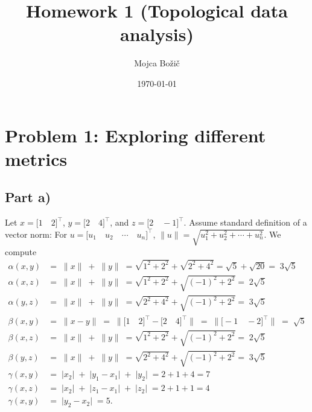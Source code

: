 \documentclass[11pt,a4paper]{article}
\title{Homework 1 (Topological data analysis)}
\author{Mojca Božič}
\date{\today}
\theoremstyle{plain}
\theoremstyle{definition}
\theoremstyle{remark}
\begin{document}
\maketitle

\tableofcontents

\section{Problem 1: Exploring different metrics}

\subsection{Part a)}

Let $x = \big[ 1 \quad 2 \big]^\top$, $y = \big[ 2\quad 4 \big]^\top$, and $z = \big[ 2 \quad -1 \big]^\top$.
Assume standard definition of a vector norm: For $u = \big[ u_1 \quad u_2 \quad \cdots \quad u_n \big]^\top$, 
$\rVert u \lVert = \sqrt{u_1^2 + u_2^2 + \cdots + u_n^2} $. We compute
\begin{equation*}
    \begin{aligned}
        \alpha(x, y) &= \;\rVert x \lVert \;+\; \rVert y \lVert \;= \sqrt{1^2 + 2^2} + \sqrt{2^2 + 4^2} = \sqrt{5} + \sqrt{20} = \; 3\sqrt{5} \\
        \alpha(x, z) &= \;\rVert x \lVert \;+ \;\rVert y \lVert \;= \sqrt{1^2 + 2^2} + \sqrt{(-1)^2 + 2^2} = \; 2\sqrt{5} \\   
        \alpha(y, z) &= \;\rVert x \lVert\; +\; \rVert y \lVert \;= \sqrt{2^2 + 4^2} + \sqrt{(-1)^2 + 2^2} = \; 3\sqrt{5} \\   
        \beta(x, y) &= \;\rVert x - y \lVert \;= \;\rVert \big[ 1 \quad 2 \big]^\top - \big[ 2\quad 4 \big]^\top \lVert \; = \; \rVert \big[ -1 \quad -2 \big]^\top \lVert \; = \; \sqrt{5} \\
        \beta(x, z) &= \;\rVert x \lVert \;+ \;\rVert y \lVert \;= \sqrt{1^2 + 2^2} + \sqrt{(-1)^2 + 2^2} = \; 2\sqrt{5} \\   
        \beta(y, z) &= \;\rVert x \lVert \;+ \;\rVert y \lVert \;= \sqrt{2^2 + 4^2} + \sqrt{(-1)^2 + 2^2} = \; 3\sqrt{5} \\   
        \gamma(x, y) &= \;\rvert x_2 \lvert \; + \; \rvert y_1 - x_1 \lvert \; + \; \rvert y_2 \lvert\;= 2 + 1 + 4 = 7 \\
        \gamma(x, z) &= \;\rvert x_2 \lvert \; + \; \rvert z_1 - x_1 \lvert \; + \; \rvert z_2 \lvert\;= 2 + 1 + 1 = 4 \\
        \gamma(x, y) &= \; \rvert y_2 - x_2 \lvert \;= 5 .
    \end{aligned}
\end{equation*}
\end{document}
